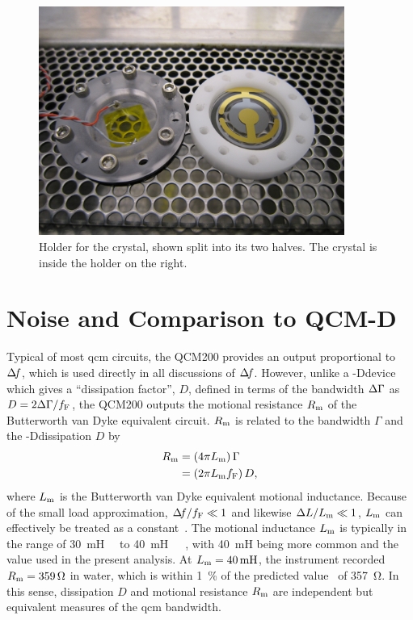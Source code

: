 \begin{figure}[ht]
\centering
\includegraphics[width=10cm,keepaspectratio]{qcm/figures/qcm_holderdiss.jpg}
\caption{Holder for the crystal, shown split into its two halves.  The
crystal is inside the holder on the right.}
\label{fig:cfqcmholder}
\end{figure}

\section{Noise and Comparison to QCM-D}\label{sec:suppqcmdcomp}
Typical of most \gls{qcm} circuits, the QCM200 provides an output proportional to
$\Delta\!f$, which is used directly in all discussions of $\Delta\!f$.  However, unlike
a \QCM-Ddevice which gives a ``dissipation factor'', $D$, defined in
terms of the bandwidth $\Delta\Gamma$ as $D=2\Delta\Gamma/f_\mathrm{F}$, the QCM200
outputs the motional resistance $R_\mathrm{m}$ of the Butterworth van Dyke
equivalent circuit.  $R_\mathrm{m}$ is related to
the bandwidth $\Gamma$ and the \QCM-Ddissipation $D$ by
\begin{align}
 R_\mathrm{m}&=\left(4 \pi L_\mathrm{m}\right) \Gamma\\
 &=\left(2 \pi L_\mathrm{m} f_\mathrm{F}\right) D,
\end{align}
where $L_\mathrm{m}$ is the Butterworth van Dyke equivalent motional inductance.
Because of the small load approximation, $\Delta\!f/f_\mathrm{F} \ll 1$ and
likewise $\Delta L/L_\mathrm{m} \ll 1$, $L_\mathrm{m}$ can effectively be treated as a
constant~\cite{geelhood2002transient}.  The motional inductance $L_\mathrm{m}$ is
typically in the range of
\SI{30}{\milli\henry}~\cite{srsqcm200manual}~\cite{hussain2005ots} to
\SI{40}{\milli\henry}~\cite{gottschling2000detection}~\cite{arnau2002circuit}~\cite{snellings2001response},
with \SI{40}{\milli\henry} being more common and the value used in the
present analysis.  At $\Lm=\SI{40}{\milli\henry}$, the instrument recorded
$R_\mathrm{m}=\SI{359}{\ohm}$ in water, which is within \SI{1}{\percent} of the
predicted value~\cite{kanazawa1985frequency} of \SI{357}{\ohm}.  In this
sense, dissipation $D$ and motional resistance $R_\mathrm{m}$ are independent but
equivalent measures of the \gls{qcm} bandwidth.

